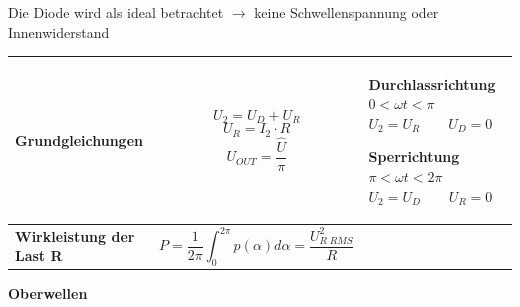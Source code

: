 \newline

Die Diode wird als ideal betrachtet $ \rightarrow $ keine Schwellenspannung oder Innenwiderstand
	\renewcommand{\arraystretch}{1}
	\vspace{-0.2cm}
\begin{longtable}{| p{} | p{} | p{} |} %
    \hline
    \textbf{Grundgleichungen}&
    \vspace{-0.5cm}
    \[ U_2 = U_D + U_R \]
    \[ U_R = I_2 \cdot R\]
    \[ U_{OUT} = \dfrac{\widehat{U}}{\pi}\]\vspace{-1cm}&
    \textbf{Durchlassrichtung}\newline
    $ 0 < \omega t < \pi $\newline
    $U_2 = U_R \qquad U_D = 0$\newline

    \textbf{Sperrichtung}\newline
    $ \pi < \omega t < 2\pi $\newline
    $ U_2=U_D \qquad U_R = 0 $\newline
    \\
    \hline
    
    \textbf{Wirkleistung der Last R}&
    \vspace{-0.5cm}
    \[ P=\frac{1}{2\pi} \int_{0}^{2\pi} p(\alpha) d\alpha = \dfrac{U_{R\;RMS}^2}{R} \] \vspace{-0.5cm}&
    \\ \hline
\end{longtable}
%
\textbf{Oberwellen}\\[0.2cm]
\vspace{-1cm}
